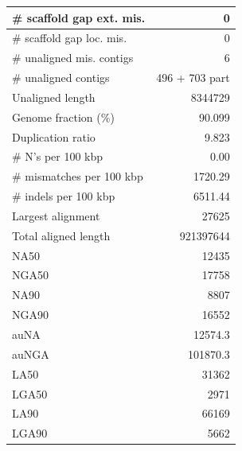 \documentclass[12pt,a4paper]{article}
\begin{document}
\begin{table}[ht]
\begin{center}
\begin{tabular}{|l*{1}{|r}|}
\# scaffold gap ext. mis. & 0 \\ \hline
\# scaffold gap loc. mis. & 0 \\ \hline
\# unaligned mis. contigs & 6 \\ \hline
\# unaligned contigs & 496 + 703 part \\ \hline
Unaligned length & 8344729 \\ \hline
Genome fraction (\%) & 90.099 \\ \hline
Duplication ratio & 9.823 \\ \hline
\# N's per 100 kbp & 0.00 \\ \hline
\# mismatches per 100 kbp & 1720.29 \\ \hline
\# indels per 100 kbp & 6511.44 \\ \hline
Largest alignment & 27625 \\ \hline
Total aligned length & 921397644 \\ \hline
NA50 & 12435 \\ \hline
NGA50 & 17758 \\ \hline
NA90 & 8807 \\ \hline
NGA90 & 16552 \\ \hline
auNA & 12574.3 \\ \hline
auNGA & 101870.3 \\ \hline
LA50 & 31362 \\ \hline
LGA50 & 2971 \\ \hline
LA90 & 66169 \\ \hline
LGA90 & 5662 \\ \hline
\end{tabular}
\end{center}
\end{table}
\end{document}
